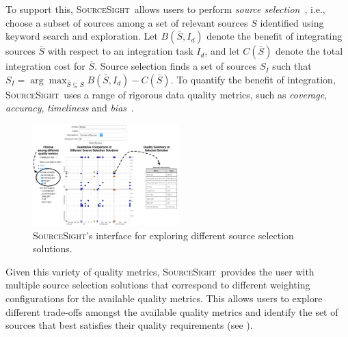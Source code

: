 \documentclass{vldb}
\newcommand\system{\textsc{SourceSight}}
\begin{document}
To support this, \system~allows users to perform {\em source selection}~\cite{dong:vldb13}, i.e., choose a subset of sources among a set of relevant sources $S$ identified using keyword search and exploration. Let $B(\bar{S},I_d)$ denote the benefit of integrating sources $\bar{S}$ with respect to an integration task $I_d$, and let $C(\bar{S})$ denote the total integration cost for $\bar{S}$. Source selection finds a set of sources $S_I$ such that $S_I = \arg\max_{\bar{S} \subseteq S}B(\bar{S},I_d) - C(\bar{S})$. To quantify the benefit of integration, \system~uses a range of rigorous data quality metrics, such as {\em coverage}, {\em accuracy}, {\em timeliness} and {\em bias}~\cite{rekatsinas:2015}. 


\begin{figure}
	\begin{center}
	\includegraphics[trim=0 0 0 85, clip,width=0.50\textwidth]{fig/ssResults}
	\vspace{-20pt}
	\caption{\system's interface for exploring different source selection solutions.}
	\label{fig:ssresults}
	\end{center}
	\vspace{-22pt}
\end{figure}

Given this variety of quality metrics, \system~provides the user with multiple source selection solutions that correspond to different weighting configurations for the available quality metrics. This allows users to explore different trade-offs amongst the available quality metrics and identify the set of sources that best satisfies their quality requirements (see ).
\end{document}
